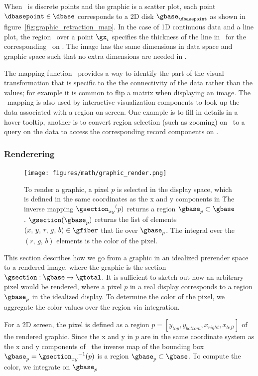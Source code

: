 \documentclass[../main.tex]{subfiles}
\begin{document}
When \dbase\ is discrete points and the graphic is a scatter plot, each point $\dbasepoint \in \dbase$ corresponds to a 2D disk $\gbase_{\dbasepoint}$ as shown in figure~\ref{fig:graphic_retraction_map}. In the case of 1D continuous data and a line plot, the region \gy\ over a point $\gx_i$ specifies the thickness of the line in \gbase\ for the corresponding \dsection\ on \dbasepoint. The image has the same dimensions in data space and graphic space such that no extra dimensions are needed in \gbase. 

The mapping function \vindex\ provides a way to identify the part of the visual transformation that is specific to the the connectivity of the data rather than the values; for example it is common to flip a matrix when displaying an image. The \vindex\ mapping is also used by interactive visualization components to look up the data associated with a region on screen.  One example is to fill in details in a hover tooltip, another is to convert region selection (such as zooming) on \gbase\ to a query on the data to access the corresponding record components on \dbase.

\subsubsection{Renderering \gsection}
\label{sec:graphic_section}
\begin{figure}
    \texttt{[image: figures/math/graphic\_render.png]}
    \caption{To render a graphic, a pixel $p$ is selected in the display space, which is defined in the same coordinates as the x and y components in \gfiber\.  The inverse mapping ${\gsection_{xy}}^(p)$ returns a region $\gbase_{p} \subset \gbase$. $\gsection(\gbase_{p})$ returns the list of elements $(x,\,y,\,r,\,g,\,b) \in \gfiber$ that lie over $\gbase_{p}$. The integral over the $(r,\,g,\,b)$ elements is the color of the pixel.}
    \label{fig:graphic_rho_lookup}
\end{figure}

This section describes how we go from a graphic in an idealized prerender space to a rendered image, where the graphic is the section $\gsection: \gbase \rightarrow \gtotal$. It is sufficient to sketch out how an arbitrary pixel would be rendered, where a pixel $p$ in a real display corresponds to a region $\gbase_p$ in the idealized display. To determine the color of the pixel, we aggregate the color values over the region via integration. 

For a 2D screen, the pixel is defined as a region $p=\left[y_{top}, y_{bottom}, x_{right}, x_{left}\right]$ of the rendered graphic. Since the x and y in $p$ are in the same coordinate system as the x and y components of \gfiber\,  the inverse map of the bounding box $\gbase_{p} ={\gsection_{xy}}^{-1}(p)$ is a region $\gbase_p \subset \gbase$. To compute the color, we integrate on $\gbase_p$
\end{document}
